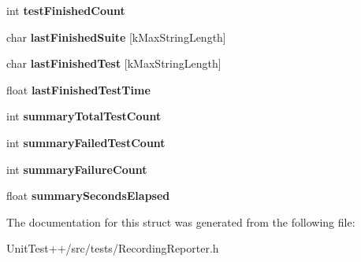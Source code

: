 \begin{DoxyCompactItemize}
\item 
\hypertarget{structRecordingReporter_aef8e0e0c72acb13de124f1981f575823}{int {\bfseries test\-Finished\-Count}}\label{structRecordingReporter_aef8e0e0c72acb13de124f1981f575823}

\item 
\hypertarget{structRecordingReporter_af37bc616262eb5ed8bc50376bc268f0c}{char {\bfseries last\-Finished\-Suite} \mbox{[}k\-Max\-String\-Length\mbox{]}}\label{structRecordingReporter_af37bc616262eb5ed8bc50376bc268f0c}

\item 
\hypertarget{structRecordingReporter_a48022ac92513d5ba00a795a316ae00b2}{char {\bfseries last\-Finished\-Test} \mbox{[}k\-Max\-String\-Length\mbox{]}}\label{structRecordingReporter_a48022ac92513d5ba00a795a316ae00b2}

\item 
\hypertarget{structRecordingReporter_a152d60d01b6222bc1d2dc716194666eb}{float {\bfseries last\-Finished\-Test\-Time}}\label{structRecordingReporter_a152d60d01b6222bc1d2dc716194666eb}

\item 
\hypertarget{structRecordingReporter_a244a5e003f9752f956c4e2fe2733e52d}{int {\bfseries summary\-Total\-Test\-Count}}\label{structRecordingReporter_a244a5e003f9752f956c4e2fe2733e52d}

\item 
\hypertarget{structRecordingReporter_a0c5a5536aaba612c4e7a97308ca8ddc2}{int {\bfseries summary\-Failed\-Test\-Count}}\label{structRecordingReporter_a0c5a5536aaba612c4e7a97308ca8ddc2}

\item 
\hypertarget{structRecordingReporter_ae5b682f675907c53d1c0134a5d6b10bb}{int {\bfseries summary\-Failure\-Count}}\label{structRecordingReporter_ae5b682f675907c53d1c0134a5d6b10bb}

\item 
\hypertarget{structRecordingReporter_aeb4fdb43f94b59127905f9b99b1f0f29}{float {\bfseries summary\-Seconds\-Elapsed}}\label{structRecordingReporter_aeb4fdb43f94b59127905f9b99b1f0f29}

\end{DoxyCompactItemize}


The documentation for this struct was generated from the following file\-:\begin{DoxyCompactItemize}
\item 
Unit\-Test++/src/tests/Recording\-Reporter.\-h\end{DoxyCompactItemize}
